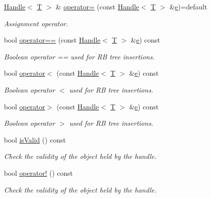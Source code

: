 \begin{DoxyCompactItemize}
\hyperlink{class_d_d4hep_1_1_handle}{Handle}$<$ \hyperlink{class_t}{T} $>$ \& \hyperlink{class_d_d4hep_1_1_handle_a5533618199d670602acedf94b39f1aa4}{operator=} (const \hyperlink{class_d_d4hep_1_1_handle}{Handle}$<$ \hyperlink{class_t}{T} $>$ \&\hyperlink{_volumes_8cpp_a8a9a1f93e9b09afccaec215310e64142}{e})=default
\begin{DoxyCompactList}\small\item\em Assignment operator. \end{DoxyCompactList}\item 
bool \hyperlink{class_d_d4hep_1_1_handle_a4db0f6aa089778ce971c00912bcc3864}{operator==} (const \hyperlink{class_d_d4hep_1_1_handle}{Handle}$<$ \hyperlink{class_t}{T} $>$ \&\hyperlink{_volumes_8cpp_a8a9a1f93e9b09afccaec215310e64142}{e}) const
\begin{DoxyCompactList}\small\item\em Boolean operator == used for RB tree insertions. \end{DoxyCompactList}\item 
bool \hyperlink{class_d_d4hep_1_1_handle_ac227419a25e6f15743393bbbeb9b8d94}{operator$<$} (const \hyperlink{class_d_d4hep_1_1_handle}{Handle}$<$ \hyperlink{class_t}{T} $>$ \&\hyperlink{_volumes_8cpp_a8a9a1f93e9b09afccaec215310e64142}{e}) const
\begin{DoxyCompactList}\small\item\em Boolean operator $<$ used for RB tree insertions. \end{DoxyCompactList}\item 
bool \hyperlink{class_d_d4hep_1_1_handle_a9e283b9c09a2c7a1ca86cf9603cc9f4d}{operator$>$} (const \hyperlink{class_d_d4hep_1_1_handle}{Handle}$<$ \hyperlink{class_t}{T} $>$ \&\hyperlink{_volumes_8cpp_a8a9a1f93e9b09afccaec215310e64142}{e}) const
\begin{DoxyCompactList}\small\item\em Boolean operator $>$ used for RB tree insertions. \end{DoxyCompactList}\item 
bool \hyperlink{class_d_d4hep_1_1_handle_a7e69d51e089a24a1773603dfa3fe5eac}{is\+Valid} () const
\begin{DoxyCompactList}\small\item\em Check the validity of the object held by the handle. \end{DoxyCompactList}\item 
bool \hyperlink{class_d_d4hep_1_1_handle_a2de5168f72effa7ecff312c72215ca89}{operator!} () const
\begin{DoxyCompactList}\small\item\em Check the validity of the object held by the handle. \end{DoxyCompactList}\item 

\end{DoxyCompactItemize}
